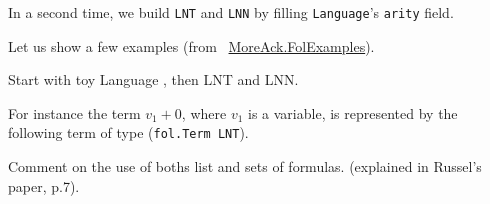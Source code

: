 
In a second time, we build \texttt{LNT} and \texttt{LNN} by filling \texttt{Language}'s \texttt{arity} field.



Let us show a few examples (from ~\href{../theories/html/hydras.MoreAck.FolExamples.html}{MoreAck.FolExamples}).




\begin{todo}
Start with toy Language , then LNT and LNN.
\end{todo}















For instance the term $v_1+0$, where $v_1$ is a variable,
is represented by the following \gallina term of type 
(\texttt{fol.Term LNT}).



\begin{todo}
Comment on the use of boths list and sets of formulas.
(explained in Russel's paper, p.7).


\end{todo}


